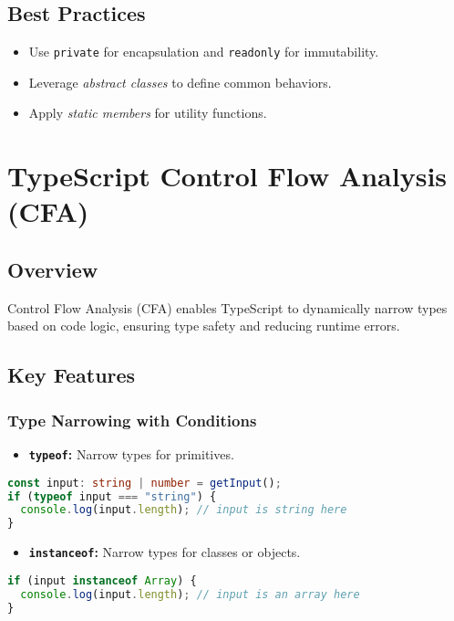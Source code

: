 \documentclass[a4paper,12pt]{article}
\begin{document}
\subsection*{Best Practices}
\begin{itemize}
    \item Use \texttt{private} for encapsulation and \texttt{readonly} for immutability.
    \item Leverage \textit{abstract classes} to define common behaviors.
    \item Apply \textit{static members} for utility functions.
\end{itemize}

\section{TypeScript Control Flow Analysis (CFA)}
\subsection*{Overview}
Control Flow Analysis (CFA) enables TypeScript to dynamically narrow types based on code logic, ensuring type safety and reducing runtime errors.

\subsection*{Key Features}
\subsubsection*{Type Narrowing with Conditions}
\begin{itemize}
    \item \textbf{\texttt{typeof}:} Narrow types for primitives.
\end{itemize}
\begin{lstlisting}[language=TypeScript]
const input: string | number = getInput();
if (typeof input === "string") {
  console.log(input.length); // input is string here
}
\end{lstlisting}

\begin{itemize}
    \item \textbf{\texttt{instanceof}:} Narrow types for classes or objects.
\end{itemize}
\begin{lstlisting}[language=TypeScript]
if (input instanceof Array) {
  console.log(input.length); // input is an array here
}
\end{lstlisting}
\end{document}
